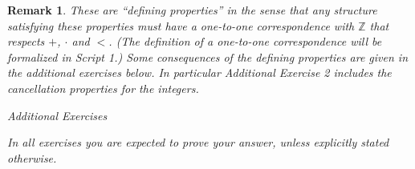 \documentclass[11pt]{article}
\newcommand{\bbZ}{\mathbb{Z}}
\newtheorem*{remark}{Remark}
\begin{document}
\begin{remark} These are ``defining properties'' in the  sense that
any structure satisfying these properties must have a one-to-one correspondence with $\bbZ$ that respects $+$, $\cdot$ and $<$. (The definition of 
a one-to-one correspondence will be formalized 
in Script 1.)
Some consequences of the defining properties are given in the additional exercises below. In particular Additional Exercise 2 includes the cancellation properties for the integers.
\end{remark}
  \newpage
 


\begin{center}
 {\em Additional Exercises}
 
 {\em In all exercises you are expected to prove your answer, unless explicitly stated otherwise.}
 
 \end{center}
\end{document}
